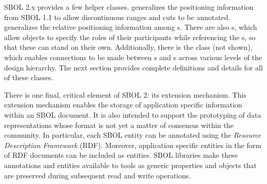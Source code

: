 SBOL 2.x provides a few helper classes.   generalizes the positioning information from SBOL 1.1 to allow discontinuous ranges and cuts to be annotated.   generalizes the relative positioning information among s.  
There are also s, which allow  objects to specify the roles of their participants while referencing the s, so that these can stand on their own.
Additionally, there is the  class (not shown), which enables connections to be made between s and s across various levels of the design hierarchy.  The next section provides complete definitions and details for all of these classes.

There is one final, critical element of SBOL 2: its extension mechanism. This extension mechanism enables the storage of application specific information within an SBOL document. It is also intended to support the prototyping of data representations whose format is not yet a matter of consensus within the community. In particular, each SBOL entity can be annotated using the \emph{Resource Description Framework} (RDF). Moreover, application specific entities in the form of RDF documents can be included as  entities. SBOL libraries make these annotations and entities available to tools as generic properties and objects that are preserved during subsequent read and write operations.
